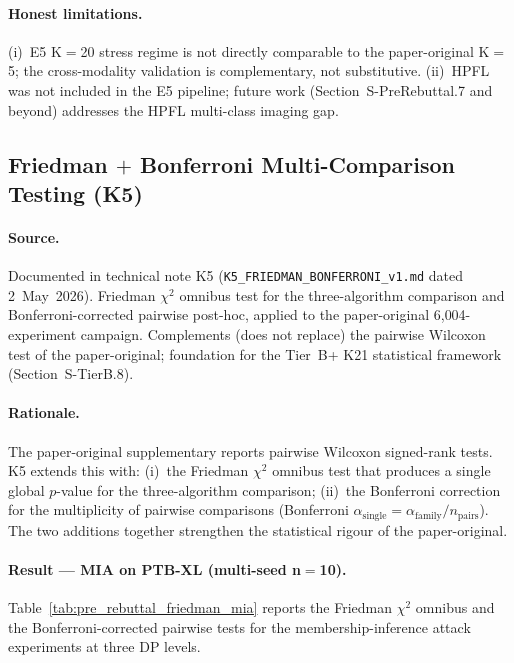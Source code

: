 \documentclass[conference]{IEEEtran}
\begin{document}
\paragraph{Honest limitations.} (i)~E5 K$=$20 stress regime is not directly comparable to the paper-original K$=$5; the cross-modality validation is complementary, not substitutive. (ii)~HPFL was not included in the E5 pipeline; future work (Section~S-PreRebuttal.7 and beyond) addresses the HPFL multi-class imaging gap.

\subsection{Friedman $+$ Bonferroni Multi-Comparison Testing (K5)}
\label{sec:pre_rebuttal_friedman}

\paragraph{Source.} Documented in technical note K5 (\texttt{K5\_FRIEDMAN\_BONFERRONI\_v1.md} dated 2~May~2026). Friedman $\chi^2$ omnibus test for the three-algorithm comparison and Bonferroni-corrected pairwise post-hoc, applied to the paper-original 6{,}004-experiment campaign. Complements (does not replace) the pairwise Wilcoxon test of the paper-original; foundation for the Tier~B+ K21 statistical framework (Section~S-TierB.8).

\paragraph{Rationale.} The paper-original supplementary reports pairwise Wilcoxon signed-rank tests. K5 extends this with: (i)~the Friedman $\chi^2$ omnibus test that produces a single global $p$-value for the three-algorithm comparison; (ii)~the Bonferroni correction for the multiplicity of pairwise comparisons (Bonferroni $\alpha_{\text{single}}{=}\alpha_{\text{family}}/n_{\text{pairs}}$). The two additions together strengthen the statistical rigour of the paper-original.

\paragraph{Result --- MIA on PTB-XL (multi-seed n$=$10).} Table~\ref{tab:pre_rebuttal_friedman_mia} reports the Friedman $\chi^2$ omnibus and the Bonferroni-corrected pairwise tests for the membership-inference attack experiments at three DP levels.
\end{document}
